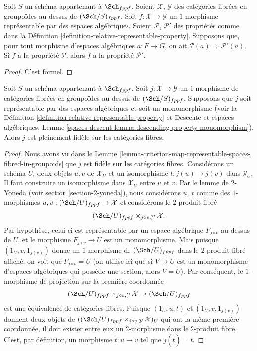 \begin{lemma}
\label{lemma-representable-transformations-property-implication}
Soit $S$ un schéma appartenant à $\Sch_{fppf}$.
Soient $\mathcal{X}$, $\mathcal{Y}$ des catégories fibrées en groupoïdes
au-dessus de $(\Sch/S)_{fppf}$.
Soit $f : \mathcal{X} \to \mathcal{Y}$ un $1$-morphisme représentable
par des espaces algébriques.
Soient $\mathcal{P}$, $\mathcal{P}'$ des propriétés comme dans la
Définition \ref{definition-relative-representable-property}.
Supposons que, pour tout morphisme d'espaces algébriques $a : F \to G$,
on ait $\mathcal{P}(a) \Rightarrow \mathcal{P}'(a)$.
Si $f$ a la propriété $\mathcal{P}$, alors
$f$ a la propriété $\mathcal{P}'$.
\end{lemma}

\begin{proof}
C'est formel.
\end{proof}

\begin{lemma}
\label{lemma-open-fibred-category-is-full}
Soit $S$ un schéma appartenant à $\Sch_{fppf}$.
Soit $j : \mathcal X \to \mathcal Y$ un $1$-morphisme de
catégories fibrées en groupoïdes au-dessus de $(\Sch/S)_{fppf}$.
Supposons que $j$ soit représentable par des espaces algébriques et soit un monomorphisme
(voir la
Définition \ref{definition-relative-representable-property}
et
Descente et espaces algébriques, Lemme
\ref{spaces-descent-lemma-descending-property-monomorphism}).
Alors $j$ est pleinement fidèle sur les catégories fibres.
\end{lemma}

\begin{proof}
Nous avons vu dans le
Lemme \ref{lemma-criterion-map-representable-spaces-fibred-in-groupoids}
que $j$ est fidèle sur les catégories fibres. Considérons un schéma $U$,
deux objets $u, v$ de $\mathcal{X}_U$ et un isomorphisme
$t : j(u) \to j(v)$ dans $\mathcal{Y}_U$. Il faut construire un
isomorphisme dans $\mathcal{X}_U$ entre $u$ et $v$.
Par le lemme de $2$-Yoneda (voir section \ref{section-2-yoneda}),
nous considérons $u$, $v$ comme des $1$-morphismes
$u, v : (\Sch/U)_{fppf} \to \mathcal{X}$
et considérons le $2$-produit fibré
$$
(\Sch/U)_{fppf} \times_{j \circ v, \mathcal{Y}} \mathcal{X}.
$$
Par hypothèse, celui-ci est représentable par un espace algébrique
$F_{j \circ v}$ au-dessus de $U$, et le morphisme
$F_{j \circ v} \to U$ est un monomorphisme.
Mais puisque $(1_U, v, 1_{j(v)})$ donne un $1$-morphisme de
$(\Sch/U)_{fppf}$ dans le $2$-produit fibré affiché,
on voit que $F_{j \circ v} = U$ (on utilise ici
que si $V \to U$ est un monomorphisme d'espaces algébriques qui possède une
section, alors $V = U$). Par conséquent, le $1$-morphisme de projection sur
la première coordonnée
$$
(\Sch/U)_{fppf} \times_{j \circ v, \mathcal{Y}} \mathcal{X}
\to (\Sch/U)_{fppf}
$$
est une équivalence de catégories fibres.
Puisque $(1_U, u, t)$ et $(1_U, v, 1_{j(v)})$ donnent deux
objets de $((\Sch/U)_{fppf} \times_{j \circ v, \mathcal{Y}}
\mathcal{X})_U$ qui ont la même première coordonnée, il doit
exister entre eux un $2$-morphisme dans le $2$-produit fibré.
C'est, par définition, un morphisme $\tilde t : u \to v$ tel que
$j(\tilde t) = t$.
\end{proof}

